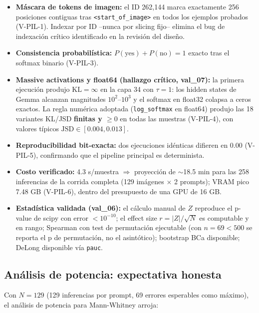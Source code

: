 \documentclass[12pt,a4paper]{article}
\newcommand{\KL}{\mathrm{KL}}
\newcommand{\JSD}{\mathrm{JSD}}
\begin{document}
\begin{itemize}[leftmargin=2em]
    \item \textbf{Máscara de tokens de imagen:} el ID 262,144 marca exactamente 256 posiciones contiguas tras \texttt{<start\_of\_image>} en todos los ejemplos probados (V-PIL-1).
    Indexar por ID --nunca por slicing fijo-- elimina el bug de indexación crítico identificado en la revisión del diseño.

    \item \textbf{Consistencia probabilística:} $P(\text{yes}) + P(\text{no}) = 1$ exacto tras el softmax binario (V-PIL-3).

    \item \textbf{Massive activations y float64 (hallazgo crítico, val\_07):} la primera ejecución produjo $\KL = \infty$ en la capa 34 con $\tau=1$: los hidden states de Gemma alcanzan magnitudes $10^2$--$10^3$ y el softmax en float32 colapsa a ceros exactos.
    La regla numérica adoptada (\texttt{log\_softmax} en float64) produjo las 18 variantes KL/JSD \textbf{finitas y $\geq 0$} en todas las muestras (V-PIL-4), con valores típicos $\JSD \in [0.004, 0.013]$.

    \item \textbf{Reproducibilidad bit-exacta:} dos ejecuciones idénticas difieren en $0.00$ (V-PIL-5), confirmando que el pipeline principal es determinista.

    \item \textbf{Costo verificado:} 4.3 s/muestra $\Rightarrow$ proyección de $\sim$18.5 min para las 258 inferencias de la corrida completa (129 imágenes $\times$ 2 prompts); VRAM pico 7.48 GB (V-PIL-6), dentro del presupuesto de una GPU de 16 GB.

    \item \textbf{Estadística validada (val\_06):} el cálculo manual de $Z$ reproduce el p-value de scipy con error $<10^{-10}$; el effect size $r = |Z|/\sqrt{N}$ es computable y en rango; Spearman con test de permutación ejecutable (con $n=69 < 500$ se reporta el p de permutación, no el asintótico); bootstrap BCa disponible; DeLong disponible vía \texttt{pauc}.
\end{itemize}

\subsection{Análisis de potencia: expectativa honesta}

Con $N = 129$ (129 inferencias por prompt, 69 errores esperables como máximo), el análisis de potencia para Mann-Whitney arroja:
\end{document}

